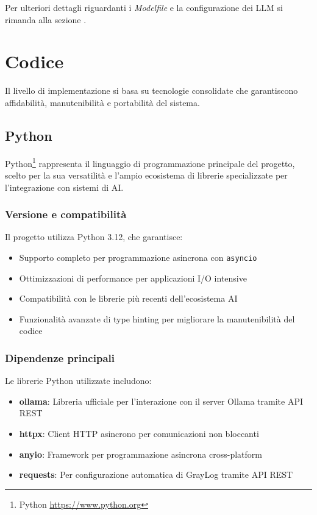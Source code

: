 \documentclass[12pt]{report}
\begin{document}
Per ulteriori dettagli riguardanti i \textit{Modelfile} e la configurazione dei LLM si rimanda alla sezione .


\section{Codice}
\label{sec:codice}

Il livello di implementazione si basa su tecnologie consolidate che garantiscono affidabilità, manutenibilità e portabilità del sistema.

\subsection{Python}
\label{subsec:python}

Python\footnote{Python \url{https://www.python.org}} rappresenta il linguaggio di programmazione principale del progetto, scelto per la sua versatilità e l'ampio ecosistema di librerie specializzate per l'integrazione con sistemi di AI.

\subsubsection{Versione e compatibilità}
Il progetto utilizza Python 3.12, che garantisce:
\begin{itemize}
    \item Supporto completo per programmazione asincrona con \texttt{asyncio}
    \item Ottimizzazioni di performance per applicazioni I/O intensive
    \item Compatibilità con le librerie più recenti dell'ecosistema AI
    \item Funzionalità avanzate di type hinting per migliorare la manutenibilità del codice
\end{itemize}

\subsubsection{Dipendenze principali}
Le librerie Python utilizzate includono:

\begin{itemize}
    \item \textbf{ollama}: Libreria ufficiale per l'interazione con il server Ollama tramite API REST
    \item \textbf{httpx}: Client HTTP asincrono per comunicazioni non bloccanti
    \item \textbf{anyio}: Framework per programmazione asincrona cross-platform
    \item \textbf{requests}: Per configurazione automatica di GrayLog tramite API REST
\end{itemize}
\end{document}
